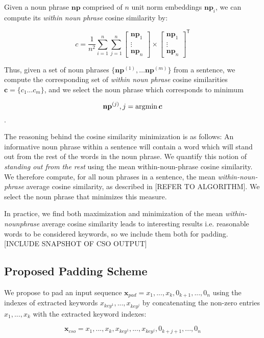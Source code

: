 Given a noun phrase $\mathbf{np}$ comprised of $n$ unit norm embeddings $\bm{np}_i$, we can compute its \textit{within noun phrase} cosine similarity by:

\[c = \frac{1}{{n^2}} \sum_{i=1}^{n} \sum_{j=1}^{n} \begin{bmatrix}
    \bm{np}_{1}   \\
    \vdots \\
    \bm{np}_{n}
  \end{bmatrix} \times \begin{bmatrix}
      \bm{np}_{1}   \\
      \vdots \\
      \bm{np}_{n}
    \end{bmatrix}^\mathsf{T}\]

Thus, given a set of noun phrases $\{\mathbf{np}^{(1)}, \dots \mathbf{np}^{(m)}\}$ from a sentence, we compute the corresponding set of
\textit{within noun phrase} cosine similarities $\bm{c} = \{c_1 \dots c_m\}$, and we select the noun phrase which corresponds to minimum

\[\mathbf{np}^{(j)}, j = \operatorname*{\arg\!\min}{\bm{c}}\].

The reasoning behind the cosine similarity minimization is as follows: An informative
noun phrase within a sentence will contain a word which will stand out from the rest of the
words in the noun phrase. We quantify this notion of \textit{standing out from the rest} using the
mean within-noun-phrase cosine similarity. We therefore compute, for all noun phrases in a
sentence, the mean \textit{within-noun-phrase} average cosine similarity, as described in [REFER TO ALGORITHM].
We select the noun phrase that minimizes this measure.

In practice, we find both maximization and minimization of the mean \textit{within-nounphrase}
average cosine similarity leads to interesting results i.e. reasonable words to be
considered keywords, so we include them both for padding.
[INCLUDE SNAPSHOT OF CSO OUTPUT]

\subsection{Proposed Padding Scheme}
We propose to pad an input sequence $\bm{x}_{pad} = x_1, ..., x_k, 0_{k+1}, ..., 0_n$ using
the indexes of extracted keywords $x_{key^1}, ..., x_{key^j}$ by concatenating
the non-zero entries $x_1, ..., x_k$ with the extracted keyword indexes:

\[\bm{x}_{cso} = x_1, ..., x_k, x_{key^1}, ..., x_{key^j}, 0_{k+j+1}, ..., 0_n\]


